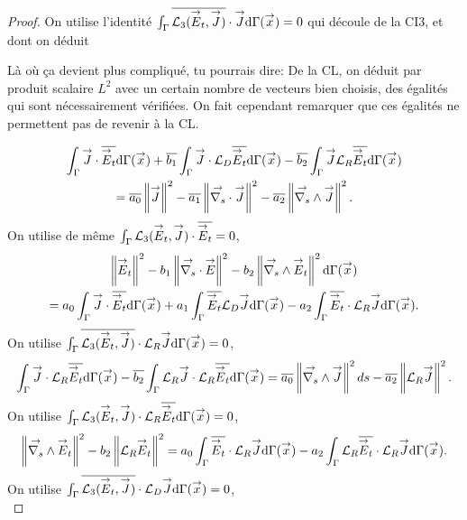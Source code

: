 \begin{proof}
    On utilise l'identité \(\int_\Gamma {\overline{\mathcal{L}_3({\overset{\rightarrow}{E}}_t,{\overset{\rightarrow}{J}})}}\cdot {\overset{\rightarrow}{J}} \mathrm{d}{\Gamma}({\overset{\rightarrow}{x}}) = 0\) qui découle de la CI3, et dont on déduit
    \begin{REM}
    Là où ça devient plus compliqué, tu pourrais dire:
    De la CL, on déduit par produit scalaire \(L^2\) avec un certain nombre de vecteurs bien choisis, des égalités qui sont nécessairement vérifiées. On fait cependant remarquer que ces égalités ne  permettent  pas de revenir  à la CL.
    \end{REM}
    \begin{multline}
      \label{eq:unicite:ci3:csu3-1}
      \int_\Gamma \vJ \cdot \conj{\vE_t}\dd{\Gamma}(\vx)   + \conj{b_1} \int_\Gamma \vJ\cdot \LD\conj{\vE_t}\dd{\Gamma}(\vx)  - \conj{b_2} \int_\Gamma \vJ \LR\conj{\vE_t}\dd{\Gamma}(\vx)  \\
      = \conj{a_0} \norm{\vJ}^2 - \conj{a_1} \norm{\vdivs \vJ}^2  - \conj{a_2} \norm{\vrots \vJ}^2. 
    \end{multline}
    On utilise de même \(\int_\Gamma {\mathcal{L}_3({\overset{\rightarrow}{E}}_t,{\overset{\rightarrow}{J}})}\cdot {\overline{{\overset{\rightarrow}{E}}_t}} = 0\),
    \begin{multline}
      \label{eq:unicite:ci3:csu3-2}
      \norm{\vE_t}^2   - b_1 \norm{ \vdivs \vE }^2  - b_2 \norm{\vrots \vE_t}^2\dd{\Gamma}(\vx)  \\
      = a_0 \int_\Gamma \vJ\cdot \conj{\vE_t}\dd{\Gamma}(\vx) + a_1 \int_\Gamma \conj{\vE_t} \LD \vJ\dd{\Gamma}(\vx)  - a_2 \int_\Gamma \conj{\vE_t} \cdot \LR \vJ \dd{\Gamma}(\vx).
    \end{multline}
    On utilise \(\int_\Gamma {\overline{\mathcal{L}_3({\overset{\rightarrow}{E}}_t,{\overset{\rightarrow}{J}})}}\cdot{\mathcal{L}_R}{\overset{\rightarrow}{J}}\mathrm{d}{\Gamma}({\overset{\rightarrow}{x}}) = 0\),
    \begin{equation}
      \label{eq:unicite:ci3:csu3-3}
      \int_\Gamma \vJ \cdot \LR \conj{\vE_t}\dd{\Gamma}(\vx)   - \conj{b_2} \int_\Gamma \LR \vJ \cdot \LR \conj{\vE_t}\dd{\Gamma}(\vx)
      =  \conj{a_0} \norm{ \vrots \vJ}^2ds - \conj{a_2} \norm{ \LR \vJ}^2. 
    \end{equation}
    On utilise \(\int_\Gamma {\mathcal{L}_3({\overset{\rightarrow}{E}}_t,{\overset{\rightarrow}{J}})}\cdot{\mathcal{L}_R}{\overline{{\overset{\rightarrow}{E}}_t}}\mathrm{d}{\Gamma}({\overset{\rightarrow}{x}})=0\),
    \begin{equation}
      \label{eq:unicite:ci3:csu3-4}
      \norm{ \vrots \vE_t }^2   - {b_2} \norm{ \LR \vE_t}^2 
      = a_0 \int_\Gamma \conj{\vE_t} \cdot \LR \vJ \dd{\Gamma}(\vx) - a_2 \int_\Gamma \LR \conj{\vE_t} \cdot \LR \vJ \dd{\Gamma}(\vx).
    \end{equation}
    On utilise \(\int_\Gamma {\overline{\mathcal{L}_3({\overset{\rightarrow}{E}}_t,{\overset{\rightarrow}{J}})}}\cdot{\mathcal{L}_D}{\overset{\rightarrow}{J}}\mathrm{d}{\Gamma}({\overset{\rightarrow}{x}})=0\),
    \begin{equation}

\end{equation}
\end{proof}
